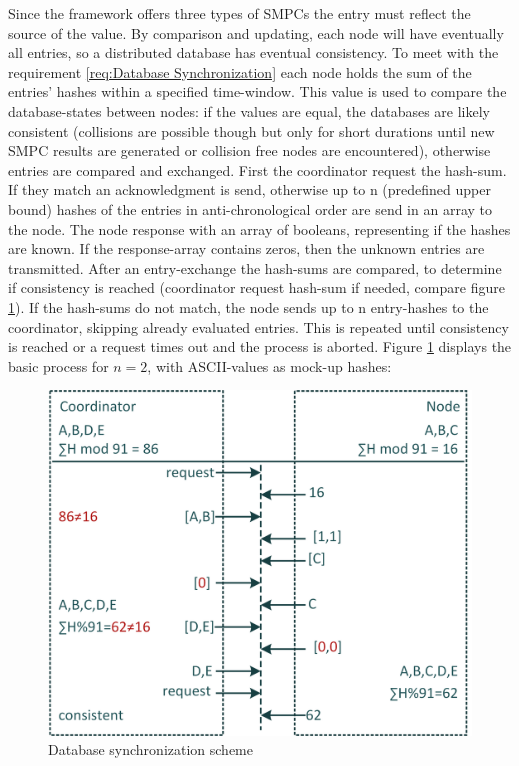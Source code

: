 Since the framework offers three types of \glspl{SMPC} the entry must reflect the source of the value. By comparison and updating, each node will have eventually all entries, so a distributed database has eventual consistency.
To meet with the requirement \ref{req:Database Synchronization} each node holds the sum of the entries' hashes within a specified time-window. This value is used to compare the database-states between nodes: if the values are equal, the databases are likely consistent (collisions are possible though but only for short durations until new \gls{SMPC} results are generated or collision free nodes are encountered), otherwise entries are compared and exchanged. First the coordinator request the hash-sum. If they match an acknowledgment is send, otherwise up to n (predefined upper bound) hashes of the entries in anti-chronological order are send in an array to the node. The node response with an array of booleans, representing if the hashes are known. If the response-array contains zeros, then the unknown entries are transmitted. After an entry-exchange the hash-sums are compared, to determine if consistency is reached (coordinator request hash-sum if needed, compare figure \ref{figure:Database synchronization scheme}). If the hash-sums do not match, the node sends up to n entry-hashes to the coordinator, skipping already evaluated entries. This is repeated until consistency is reached or a request times out and the process is aborted.
Figure \ref{figure:Database synchronization scheme} displays the basic process for $n=2$, with ASCII-values as mock-up hashes:

\begin{figure}[!htbp] %
	\caption{Database synchronization scheme} \label{figure:Database synchronization scheme}
	\includegraphics[scale=1.0]{figures/db-synchronization-ion.png}
\end{figure}

